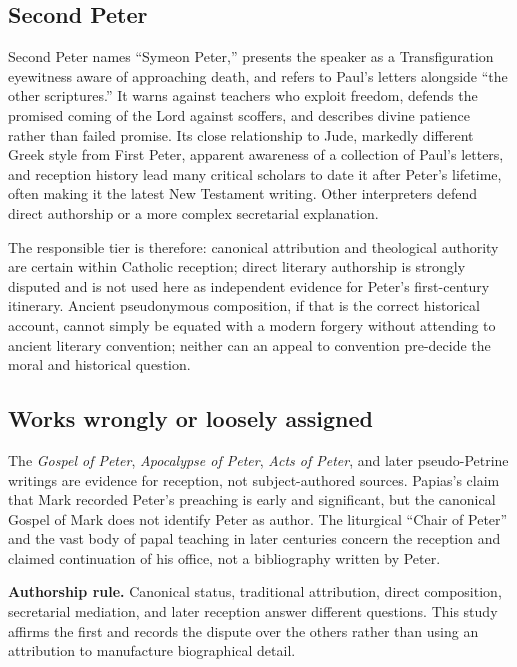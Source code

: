 \subsection{Second Peter}

Second Peter names ``Symeon Peter,'' presents the speaker as a Transfiguration
eyewitness aware of approaching death, and refers to Paul's letters alongside
``the other scriptures.'' It warns against teachers who exploit freedom,
defends the promised coming of the Lord against scoffers, and describes
divine patience rather than failed promise. Its close relationship to Jude,
markedly different Greek style from First Peter, apparent awareness of a
collection of Paul's letters, and reception history lead many critical
scholars to date it after Peter's lifetime, often making it the latest New
Testament writing. Other interpreters defend direct authorship or a more
complex secretarial explanation.

The responsible tier is therefore: canonical attribution and theological
authority are certain within Catholic reception; direct literary authorship
is strongly disputed and is not used here as independent evidence for
Peter's first-century itinerary. Ancient pseudonymous composition, if that is
the correct historical account, cannot simply be equated with a modern
forgery without attending to ancient literary convention; neither can an
appeal to convention pre-decide the moral and historical question.

\subsection{Works wrongly or loosely assigned}

The \emph{Gospel of Peter}, \emph{Apocalypse of Peter}, \emph{Acts of Peter},
and later pseudo-Petrine writings are evidence for reception, not
subject-authored sources. Papias's claim that Mark recorded Peter's preaching
is early and significant, but the canonical Gospel of Mark does not identify
Peter as author. The liturgical ``Chair of Peter'' and the vast body of papal
teaching in later centuries concern the reception and claimed continuation of
his office, not a bibliography written by Peter.

\begin{studyframe}
\textbf{Authorship rule.} Canonical status, traditional attribution, direct
composition, secretarial mediation, and later reception answer different
questions. This study affirms the first and records the dispute over the
others rather than using an attribution to manufacture biographical detail.
\end{studyframe}
